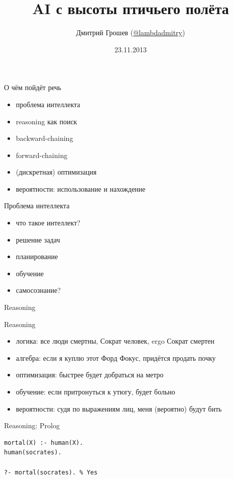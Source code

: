 \documentclass[10pt]{beamer}
\title[aioverview]{AI с высоты птичьего полёта}
\author{Дмитрий Грошев (\href{http://twitter.com/lambdadmitry}{@lambdadmitry})}
\date{23.11.2013}
\begin{document}
\renewcommand*{\inserttotalframenumber}{\pageref{lastframe}}
\begin{frame}
\titlepage
\end{frame}

\begin{frame}{О чём пойдёт речь}
  \begin{itemize}
  \item проблема интеллекта
  \item reasoning как поиск
  \item backward-chaining
  \item forward-chaining
  \item (дискретная) оптимизация
  \item вероятности: использование и нахождение
  \end{itemize}
\end{frame}

\begin{frame}{Проблема интеллекта}
  \begin{itemize}
  \item что такое интеллект?
  \item решение задач
  \item планирование
  \item обучение
  \item самосознание?
  \end{itemize}
\end{frame}

\begin{frame}
  \Large
  Reasoning
\end{frame}

\begin{frame}{Reasoning}
  \begin{itemize}
  \item логика: все люди смертны, Сократ человек, ergo Сократ смертен
  \item алгебра: если я куплю этот Форд Фокус, придётся продать почку
  \item оптимизация: быстрее будет добраться на метро
  \item обучение: если притронуться к утюгу, будет больно
  \item вероятности: судя по выражениям лиц, меня (вероятно) будут бить
  \end{itemize}
\end{frame}

\begin{frame}[fragile]{Reasoning: Prolog}
  \begin{verbatim}
mortal(X) :- human(X).
human(socrates).

?- mortal(socrates). % Yes
  \end{verbatim}
\end{frame}
\end{document}
